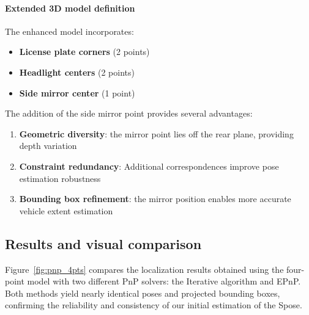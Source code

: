 \paragraph{Extended 3D model definition}
The enhanced model incorporates:
\begin{itemize}
    \item \textbf{License plate corners} (2 points)
    \item \textbf{Headlight centers} (2 points)
    \item \textbf{Side mirror center} (1 point)
\end{itemize}
The addition of the side mirror point provides several advantages:
\begin{enumerate}
    \item \textbf{Geometric diversity}: the mirror point lies off the rear plane, providing depth variation
    \item \textbf{Constraint redundancy}: Additional correspondences improve pose estimation robustness
    \item \textbf{Bounding box refinement}: the mirror position enables more accurate vehicle extent estimation
\end{enumerate}

\subsection{Results and visual comparison}

Figure~\ref{fig:pnp_4pts} compares the localization results obtained using the four-point model with two different PnP solvers: the Iterative algorithm and EPnP. Both methods yield nearly identical poses and projected bounding boxes, confirming the reliability and consistency of our initial estimation of the Spose.

